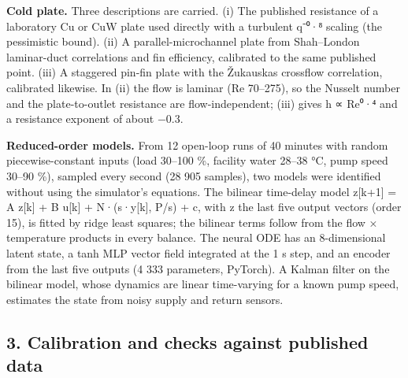 \documentclass[
  10pt,
]{article}
\begin{document}
\textbf{Cold plate.} Three descriptions are carried. (i) The published resistance of a laboratory Cu or CuW plate used directly with a turbulent q⁻⁰·⁸ scaling (the pessimistic bound). (ii) A parallel-microchannel plate from Shah--London laminar-duct correlations and fin efficiency, calibrated to the same published point. (iii) A staggered pin-fin plate with the Žukauskas crossflow correlation, calibrated likewise. In (ii) the flow is laminar (Re 70--275), so the Nusselt number and the plate-to-outlet resistance are flow-independent; (iii) gives h ∝ Re⁰·⁴ and a resistance exponent of about −0.3.

\textbf{Reduced-order models.} From 12 open-loop runs of 40 minutes with random piecewise-constant inputs (load 30--100 \%, facility water 28--38 °C, pump speed 30--90 \%), sampled every second (28 905 samples), two models were identified without using the simulator's equations. The bilinear time-delay model z{[}k+1{]} = A z{[}k{]} + B u{[}k{]} + N·(s·y{[}k{]}, P/s) + c, with z the last five output vectors (order 15), is fitted by ridge least squares; the bilinear terms follow from the flow × temperature products in every balance. The neural ODE has an 8-dimensional latent state, a tanh MLP vector field integrated at the 1 s step, and an encoder from the last five outputs (4 333 parameters, PyTorch). A Kalman filter on the bilinear model, whose dynamics are linear time-varying for a known pump speed, estimates the state from noisy supply and return sensors.

\hypertarget{calibration-and-checks-against-published-data}{%
\subsection{3. Calibration and checks against published data}\label{calibration-and-checks-against-published-data}}
\end{document}
